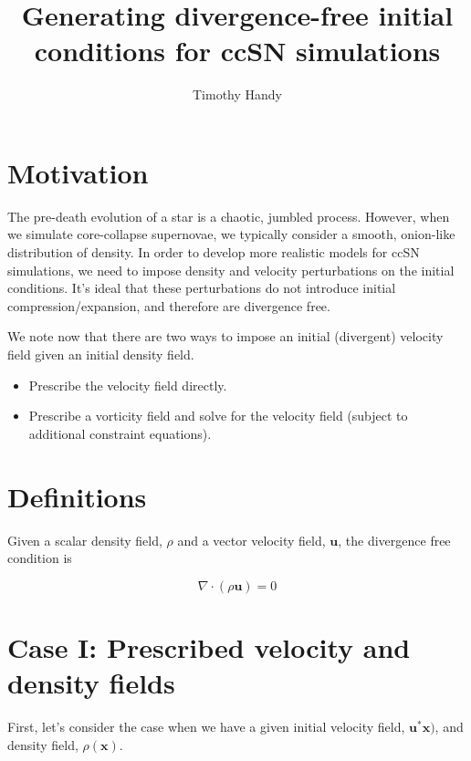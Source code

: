 \documentclass[a4paper,10pt]{article}
\title{Generating divergence-free initial conditions for ccSN simulations}
\author{Timothy Handy}
\newcommand{\vect}[1]{\bm{#1}}
\begin{document}
\maketitle

\begin{abstract}

\end{abstract}

\section{Motivation}

The pre-death evolution of a star is a chaotic, jumbled process. However, when we simulate core-collapse supernovae, we typically consider a smooth, onion-like distribution of density. In order to develop more realistic models for ccSN simulations, we need to impose density and velocity perturbations on the initial conditions. It's ideal that these perturbations do not introduce initial compression/expansion, and therefore are divergence free.

We note now that there are two ways to impose an initial (divergent) velocity field given an initial density field. 
\begin{itemize}
\item Prescribe the velocity field directly. 
\item Prescribe a vorticity field and solve for the velocity field (subject to additional constraint equations).
\end{itemize}

\section{Definitions}

Given a scalar density field, $\rho$ and a vector velocity field, $\vect{u}$, the divergence free condition is 

\begin{equation}
\nabla\cdot(\rho\vect{u}) = 0
\end{equation}

\section{Case I: Prescribed velocity and density fields}

First, let's consider the case when we have a given initial velocity field, $\vect{u^*}\vect{x})$, and density field, $\rho(\vect{x})$.
\end{document}
